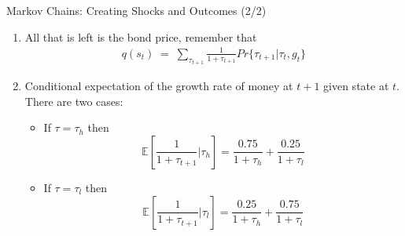 \documentclass[10pt,c,aspectratio=1610,handout]{beamer}
\begin{document}
\begin{frame}{Markov Chains: Creating Shocks and Outcomes (2/2)}%
  \begin{small}%
    \begin{enumerate}%
      \item[6.] All that is left is the bond price, remember that%
      \begin{align*}%
        q(s_t) \; = \; \sum_{\tau_{t+1}} \frac{1}{1+\tau_{t+1}} Pr\{ \tau_{t+1} | \tau_t, g_t\}%
      \end{align*}%
      \pause%
      \item[7.] Conditional expectation of the growth rate of money at $t+1$ given state at $t$. There are two cases:%
      \pause%
      \begin{itemize}%
        \item[$\rightarrow$] If $\tau = \tau_h$ then \[ \mathbb{E} \left[ \frac{1}{1+\tau_{t+1} } \Big | \tau_h \right] = \frac{0.75}{1+\tau_h} +  \frac{0.25}{1+\tau_l} \]%
        \pause%
        \item[$\rightarrow$] If $\tau = \tau_l$ then \[ \mathbb{E} \left [ \frac{1}{1+\tau_{t+1} } \Big | \tau_l \right ] = \frac{0.25}{1+\tau_h} +  \frac{0.75}{1+\tau_l} \]%
      \end{itemize}%
    \end{enumerate}%
  \end{small}%
\end{frame}%
\end{document}
